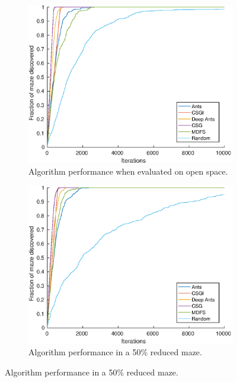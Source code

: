 \documentclass{article}
\begin{document}
\begin{figure}[H]
    \centering
    \begin{subfigure}[b]{0.45\textwidth}
        \includegraphics[width=\textwidth]{Covered_vs_iterations_for_3_agents_on_50x50_map_Easy=00.eps}
        \caption{ Algorithm performance when evaluated on open space.}
    \end{subfigure}
    \begin{subfigure}[b]{0.45\textwidth}
        \includegraphics[width=\textwidth]{Covered_vs_iterations_for_3_agents_on_50x50_map_Easy=05.eps}
        \caption{ Algorithm performance in a 50\% reduced maze. }
    \end{subfigure}


\end{figure}
\end{document}
